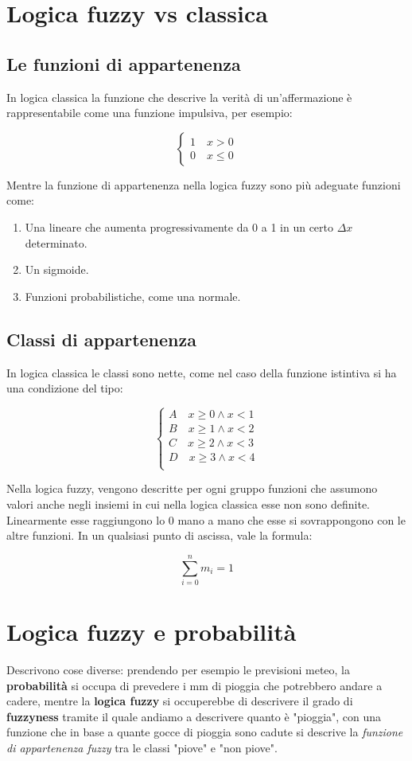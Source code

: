 \documentclass[\main/main.tex]{subfiles}
\begin{document}
\section{Logica fuzzy vs classica}
\subsection{Le funzioni di appartenenza}
In logica classica la funzione che descrive la verità di un'affermazione è rappresentabile come una funzione impulsiva, per esempio:

\[
	\begin{cases}
		1 \quad x > 0\\
		0 \quad x \leq 0
	\end{cases}
\]

Mentre la funzione di appartenenza nella logica fuzzy sono più adeguate funzioni come:

\begin{enumerate}
\item Una lineare che aumenta progressivamente da 0 a 1 in un certo $\Delta x$ determinato.
\item Un sigmoide.
\item Funzioni probabilistiche, come una normale.
\end{enumerate}

\subsection{Classi di appartenenza}
In logica classica le classi sono nette, come nel caso della funzione istintiva si ha una condizione del tipo:

\[
	\begin{cases}
		A \quad x \geq 0 \wedge x<1\\
		B \quad x \geq 1 \wedge x<2\\
		C \quad x \geq 2 \wedge x<3\\
		D \quad x \geq 3 \wedge x<4\\
	\end{cases}
\]

Nella logica fuzzy, vengono descritte per ogni gruppo funzioni che assumono valori anche negli insiemi in cui nella logica classica esse non sono definite. Linearmente esse raggiungono lo 0 mano a mano che esse si sovrappongono con le altre funzioni. In un qualsiasi punto di ascissa, vale la formula:

\[
	\sum_{i=0}^{n} m_i = 1 
\]

\section{Logica fuzzy e probabilità}
Descrivono cose diverse: prendendo per esempio le previsioni meteo, la \textbf{probabilità} si occupa di prevedere i mm di pioggia che potrebbero andare a cadere, mentre la \textbf{logica fuzzy} si occuperebbe di descrivere il grado di \textbf{fuzzyness} tramite il quale andiamo a descrivere quanto è "pioggia", con una funzione che in base a quante gocce di pioggia sono cadute si descrive la \textit{funzione di appartenenza fuzzy} tra le classi "piove" e "non piove".
\end{document}
